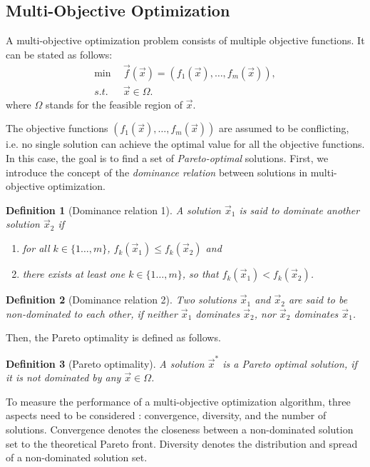 \documentclass[10pt,journal,compsoc]{IEEEtran}
\newtheorem{definition}{Definition}
\begin{document}
\subsection{Multi-Objective Optimization}

A multi-objective optimization problem consists of multiple objective functions. It can be stated as follows:
\begin{align}
\min \ \ & \vec{f}(\vec{x}) = (f_1(\vec{x}), \dots, f_m(\vec{x})), \\
s.t. \ \ & \vec{x} \in \Omega.
\end{align}
where $\Omega$ stands for the feasible region of $\vec{x}$.

The objective functions $(f_1(\vec{x}), \dots, f_m(\vec{x}))$ are assumed to be conflicting, i.e. no single solution can achieve the optimal value for all the objective functions. In this case, the goal is to find a set of \emph{Pareto-optimal} solutions. First, we introduce the concept of the \emph{dominance relation} between solutions in multi-objective optimization.
\begin{definition}[Dominance relation 1]
	A solution $\vec{x}_1$ is said to \emph{dominate} another solution $\vec{x}_2$ if 
	\begin{enumerate}
		\item for all $k \in \{1 \dots, m\}$, $f_k(\vec{x}_1) \leq f_k(\vec{x}_2)$ and
		\item there exists at least one $k \in \{1 \dots, m\}$, so that $f_k(\vec{x}_1) < f_k(\vec{x}_2)$.
	\end{enumerate}
\end{definition}
\begin{definition}[Dominance relation 2]
	Two solutions $\vec{x}_1$ and $\vec{x}_2$ are said to be \emph{non-dominated} to each other, if \emph{neither $\vec{x}_1$ dominates $\vec{x}_2$, nor $\vec{x}_2$ dominates $\vec{x}_1$}.
\end{definition}
Then, the Pareto optimality is defined as follows.
\begin{definition}[Pareto optimality]
	A solution $\vec{x}^*$ is a \emph{Pareto optimal solution}, if it is not dominated by any $\vec{x} \in \Omega$.
\end{definition}


To measure the performance of a multi-objective optimization algorithm, three aspects need to be considered \cite{Okabe:je,7360024}: convergence, diversity, and the number of solutions.
Convergence denotes the closeness between a non-dominated solution set to the theoretical Pareto front. Diversity denotes the distribution and spread of a non-dominated solution set.
\end{document}
